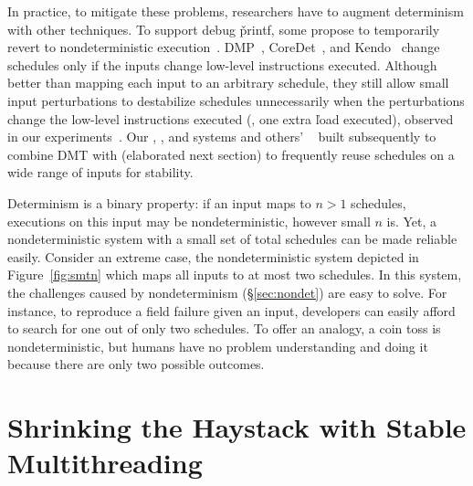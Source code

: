 In practice, to mitigate these problems, researchers have to augment
determinism with other techniques.  To support debug \v{printf}, some
propose to temporarily revert to nondeterministic
execution~\cite{dmp:asplos09}.  DMP~\cite{dmp:asplos09},
CoreDet~\cite{coredet:asplos10}, and Kendo~\cite{kendo:asplos09} change
schedules only if the inputs change low-level instructions executed.
Although better than mapping each input to an arbitrary schedule, they
still allow small input perturbations to destabilize schedules
unnecessarily when the perturbations change the low-level instructions
executed (\eg, one extra \v{load} executed), observed in our
experiments~\cite{cui:tern:osdi10}. Our \tern, \peregrine, and \parrot systems
and others' \dthreads~\cite{dthreads:sosp11} built subsequently to \tern combine
DMT with \smt (elaborated next section) to frequently reuse schedules on a
wide range of inputs for stability.

 Determinism
is a binary property: if an input maps to $n > 1$ schedules, executions on this
input may be nondeterministic, however small $n$ is.  Yet, a nondeterministic
system with a small set of total schedules can be made reliable easily. 
Consider an extreme case, the nondeterministic system depicted in
Figure~\ref{fig:smtn} which maps all inputs to at most two schedules.  In this
system, the challenges caused by nondeterminism (\S\ref{sec:nondet}) are
easy to solve.  For instance, to reproduce a field failure given an input,
developers can easily afford to search for one out of only two schedules.
To offer an analogy, a coin toss is nondeterministic, but humans have
no problem understanding and doing it because there are only two possible
outcomes.


\section{Shrinking the Haystack with Stable Multithreading} \label{sec:smt}

